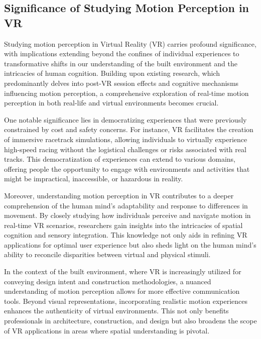 \documentclass[a4paper, 12pt, oneside]{article}
\begin{document}
        \subsection{Significance of Studying Motion Perception in VR}

        Studying motion perception in Virtual Reality (VR) carries profound significance, with implications extending beyond 
        the confines of individual experiences to transformative shifts in our understanding of the built environment and the 
        intricacies of human cognition. Building upon existing research, which predominantly delves into post-VR session effects
         and cognitive mechanisms influencing motion perception, a comprehensive exploration of real-time motion perception in 
         both real-life and virtual environments becomes crucial.

        One notable significance lies in democratizing experiences that were previously constrained by cost and safety concerns. 
        For instance, VR facilitates the creation of immersive racetrack simulations, allowing individuals to virtually experience 
        high-speed racing without the logistical challenges or risks associated with real tracks. This democratization of 
        experiences can extend to various domains, offering people the opportunity to engage with environments and activities 
        that might be impractical, inaccessible, or hazardous in reality.
        
        Moreover, understanding motion perception in VR contributes to a deeper comprehension of the human mind's adaptability and 
        response to differences in movement. By closely studying how individuals perceive and navigate motion in real-time VR 
        scenarios, researchers gain insights into the intricacies of spatial cognition and sensory integration. This knowledge not 
        only aids in refining VR applications for optimal user experience but also sheds light on the human mind's ability to 
        reconcile disparities between virtual and physical stimuli.
        
        In the context of the built environment, where VR is increasingly utilized for conveying design intent and construction 
        methodologies, a nuanced understanding of motion perception allows for more effective communication tools. Beyond visual
         representations, incorporating realistic motion experiences enhances the authenticity of virtual environments. This not 
         only benefits professionals in architecture, construction, and design but also broadens the scope of VR applications in 
         areas where spatial understanding is pivotal.
\end{document}
